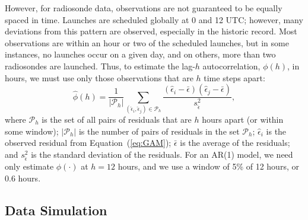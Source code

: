 \documentclass[12pt]{article}
\def\ni{\noindent}
\begin{document}
\begin{doublespacing}
However, for radiosonde data, observations are not guaranteed to be equally spaced in time.  Launches are scheduled globally at 0 and 12 UTC; however, many deviations from this pattern are observed, especially in the historic record.  Most observations are within an hour or two of the scheduled launches, but in some instances, no launches occur on a given day, and on others, more than two radiosondes are launched.   Thus, to estimate the lag-$h$  autocorrelation, ${\phi}(h)$, in hours, we must use only those observations that are $h$ time steps apart:
\begin{equation} \label{eq:ACF}
	\widehat{\phi}(h)=\frac{1}{\lvert \mathcal{P}_h\rvert} \sum_{(\hat{\epsilon}_i,\hat{\epsilon}_j) \in \mathcal{P}_h} \frac{(\hat{\epsilon}_i-\bar{\epsilon})(\hat{\epsilon}_j-\bar{\epsilon})}{s^2_{\hat\epsilon}},
\end{equation}
\ni where $\mathcal{P}_h$ is the set of all pairs of residuals that are $h$ hours apart (or within some window); $|\mathcal{P}_h|$ is the number of pairs of residuals in the set $\mathcal{P}_h$;  $\hat{\epsilon}_i$ is the observed residual from Equation~(\ref{eq:GAM}); $\bar\epsilon$ is the average of the residuals; and $s^2_{\hat\epsilon}$ is the standard deviation of the residuals.  For an AR(1) model, we need only estimate $\phi(\cdot)$ at $h=12$ hours, and we use a window of 5\% of 12 hours, or 0.6 hours.

\subsection{Data Simulation}
\label{ssec:sim}


\end{doublespacing}
\end{document}
